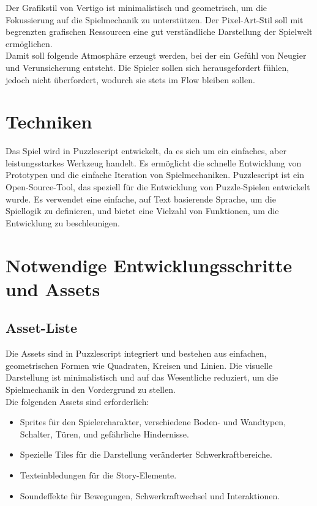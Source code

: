 \documentclass{article}
\begin{document}
Der Grafikstil von Vertigo ist minimalistisch und geometrisch, um die Fokussierung auf die Spielmechanik zu unterstützen.
Der Pixel-Art-Stil soll mit begrenzten grafischen Ressourcen eine gut verständliche Darstellung der Spielwelt ermöglichen.
\\
Damit soll folgende Atmosphäre erzeugt werden, bei der ein Gefühl von Neugier und Verunsicherung entsteht.
Die Spieler sollen sich herausgefordert fühlen, jedoch nicht überfordert, wodurch sie stets im Flow bleiben sollen.

\section{Techniken}
Das Spiel wird in Puzzlescript entwickelt, da es sich um ein einfaches, aber leistungsstarkes Werkzeug handelt.
Es ermöglicht die schnelle Entwicklung von Prototypen und die einfache Iteration von Spielmechaniken.
Puzzlescript ist ein Open-Source-Tool, das speziell für die Entwicklung von Puzzle-Spielen entwickelt wurde.
Es verwendet eine einfache, auf Text basierende Sprache, um die Spiellogik zu definieren, und bietet eine Vielzahl von Funktionen,
um die Entwicklung zu beschleunigen.

\section{Notwendige Entwicklungsschritte und Assets}
\subsection{Asset-Liste}
Die Assets sind in Puzzlescript integriert und bestehen aus einfachen, geometrischen Formen wie Quadraten, Kreisen und Linien.
Die visuelle Darstellung ist minimalistisch und auf das Wesentliche reduziert, um die Spielmechanik in den Vordergrund zu stellen.
\\
Die folgenden Assets sind erforderlich:
\begin{itemize}
    \item Sprites für den Spielercharakter, verschiedene Boden- und Wandtypen, Schalter, Türen, und gefährliche Hindernisse.
    \item Spezielle Tiles für die Darstellung veränderter Schwerkraftbereiche.
    \item Texteinbledungen für die Story-Elemente.
    \item Soundeffekte für Bewegungen, Schwerkraftwechsel und Interaktionen.
\end{itemize}
\end{document}
